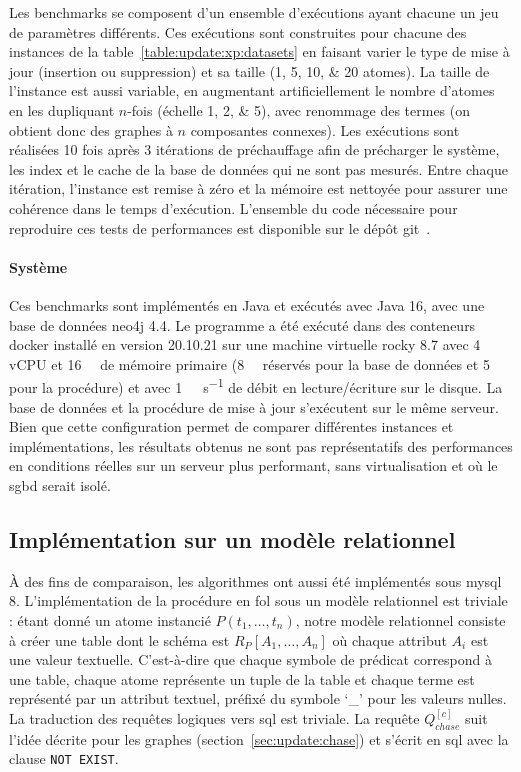 Les benchmarks se composent d'un ensemble d'exécutions ayant chacune un jeu de paramètres différents.
Ces exécutions sont construites pour chacune des instances de la table~\ref{table:update:xp:datasets} en faisant varier le type de mise à jour (insertion ou suppression) et sa taille (\numlist{1;5;10;20} atomes).
La taille de l'instance est aussi variable, en augmentant artificiellement le nombre d'atomes en les dupliquant $n$-fois (échelle \numlist{1;2;5}), avec renommage des termes (on obtient donc des graphes à $n$ composantes connexes).
Les exécutions sont réalisées \num{10} fois après \num{3} itérations de préchauffage afin de précharger le système, les index et le cache de la base de données qui ne sont pas mesurés.
Entre chaque itération, l'instance est remise à zéro et la mémoire est nettoyée pour assurer une cohérence dans le temps d'exécution.
L'ensemble du code nécessaire pour reproduire ces tests de performances est disponible sur le dépôt \gls{git}~\cite{chabinDataFix2023}.

\paragraph{Système}
Ces benchmarks sont implémentés en Java et exécutés avec {Java 16}, avec une base de données \gls{neo4j} 4.4.
Le programme a été exécuté dans des conteneurs \gls{docker} installé en version 20.10.21 sur une machine virtuelle \gls{rocky} 8.7 avec \num{4} vCPU et \SI{16}{\giga\byte} de mémoire primaire (\SI{8}{\giga\byte} réservés pour la base de données et \SI{5}{\giga\byte} pour la procédure) et avec \SI{1}{\giga\byte\per\second} de débit en lecture/écriture sur le disque.
La base de données et la procédure de mise à jour s'exécutent sur le même serveur.
Bien que cette configuration permet de comparer différentes instances et implémentations, les résultats obtenus ne sont pas représentatifs des performances en conditions réelles sur un serveur plus performant, sans virtualisation et où le \gls{sgbd} serait isolé.

\subsection{Implémentation sur un modèle relationnel}
\label{sec:update:evaluation:mysql}
À des fins de comparaison, les algorithmes ont aussi été implémentés sous \gls{mysql} 8.
L'implémentation de la procédure en \gls{fol} sous un modèle relationnel est triviale : étant donné un atome instancié $P(t_1, \dots, t_n)$, notre modèle relationnel consiste à créer une table dont le schéma est $R_P[A_1, \dots, A_n]$ où chaque attribut $A_i$ est une valeur textuelle.
C'est-à-dire que chaque symbole de prédicat correspond à une table, chaque atome représente un tuple de la table et chaque terme est représenté par un attribut textuel, préfixé du symbole `\_' pour les valeurs nulles.
La traduction des requêtes logiques vers \gls{sql} est triviale.
La requête $Q_{chase}^{[c]}$ suit l'idée décrite pour les graphes (section~\ref{sec:update:chase}) et s'écrit en \gls{sql} avec la clause \verb|NOT EXIST|.

